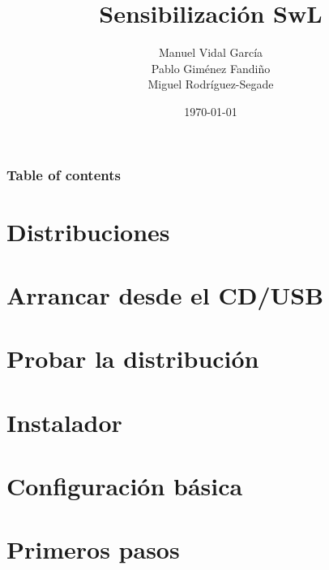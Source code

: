 \documentclass{beamer}
\title{Sensibilización SwL}
\author{Manuel Vidal García\\ Pablo Giménez Fandiño\\ Miguel Rodríguez-Segade}
\date{\today}
\begin{document}
\begin{frame}
    \titlepage
\end{frame}

\begin{frame} \frametitle{Table of contents}
    \tableofcontents
\end{frame}

\section{Distribuciones}


\section{Arrancar desde el CD/USB}

\begin{frame}

\end{frame}

\section{Probar la distribución}

\section{Instalador}

\section{Configuración básica}

\section{Primeros pasos}
\end{document}
